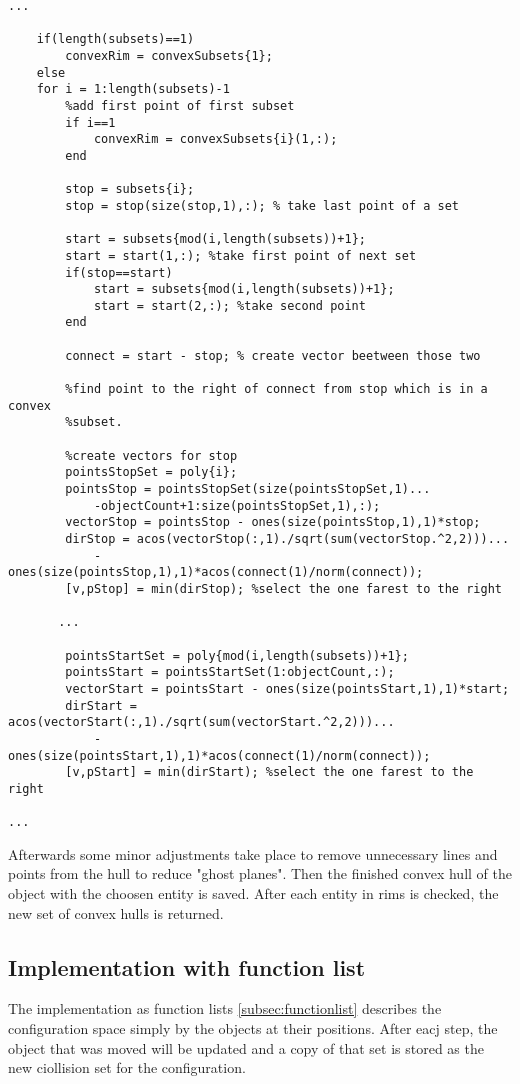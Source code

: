 \begin{lstlisting}
...

    if(length(subsets)==1)
        convexRim = convexSubsets{1};
    else        
    for i = 1:length(subsets)-1
        %add first point of first subset
        if i==1
            convexRim = convexSubsets{i}(1,:);
        end
        
        stop = subsets{i};
        stop = stop(size(stop,1),:); % take last point of a set
        
        start = subsets{mod(i,length(subsets))+1};
        start = start(1,:); %take first point of next set
        if(stop==start)
            start = subsets{mod(i,length(subsets))+1};
            start = start(2,:); %take second point
        end
        
        connect = start - stop; % create vector beetween those two
        
        %find point to the right of connect from stop which is in a convex
        %subset. 
        
        %create vectors for stop
        pointsStopSet = poly{i};
        pointsStop = pointsStopSet(size(pointsStopSet,1)...
            -objectCount+1:size(pointsStopSet,1),:);
        vectorStop = pointsStop - ones(size(pointsStop,1),1)*stop; 
        dirStop = acos(vectorStop(:,1)./sqrt(sum(vectorStop.^2,2)))...
            - ones(size(pointsStop,1),1)*acos(connect(1)/norm(connect));
        [v,pStop] = min(dirStop); %select the one farest to the right
        
       ...

        pointsStartSet = poly{mod(i,length(subsets))+1};
        pointsStart = pointsStartSet(1:objectCount,:);
        vectorStart = pointsStart - ones(size(pointsStart,1),1)*start;
        dirStart = acos(vectorStart(:,1)./sqrt(sum(vectorStart.^2,2)))...
            - ones(size(pointsStart,1),1)*acos(connect(1)/norm(connect));
        [v,pStart] = min(dirStart); %select the one farest to the right
  
...
\end{lstlisting}
Afterwards some minor adjustments take place to remove unnecessary lines and points from the hull to reduce "ghost planes". 
Then the finished convex hull of the object with the choosen entity is saved. After each entity in rims is checked, the new set of convex hulls is returned.

\subsection{Implementation with function list}
The implementation as function lists \ref{subsec:functionlist} describes the configuration space simply by the objects at their positions. After eacj step, the object that was moved will be updated and a copy of that set is stored as the new ciollision set for the configuration.
